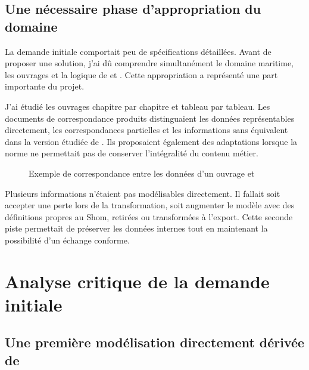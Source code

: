 \subsection{Une nécessaire phase d'appropriation du domaine}

La demande initiale comportait peu de spécifications détaillées. Avant de proposer une solution, j'ai dû comprendre simultanément le domaine maritime, les ouvrages  et la logique de  et . Cette appropriation a représenté une part importante du projet.

J'ai étudié les ouvrages chapitre par chapitre et tableau par tableau. Les documents de correspondance produits distinguaient les données représentables directement, les correspondances partielles et les informations sans équivalent dans la version étudiée de . Ils proposaient également des adaptations lorsque la norme ne permettait pas de conserver l'intégralité du contenu métier.

\begin{figure}[H]
\centering
{}
\caption{Exemple de correspondance entre les données d'un ouvrage  et }
\label{fig:correspondance-rsx-s123}
\end{figure}

Plusieurs informations n'étaient pas modélisables directement. Il fallait soit accepter une perte lors de la transformation, soit augmenter le modèle avec des définitions propres au Shom, retirées ou transformées à l'export. Cette seconde piste permettait de préserver les données internes tout en maintenant la possibilité d'un échange conforme.

\section{Analyse critique de la demande initiale}

\subsection{Une première modélisation directement dérivée de }

